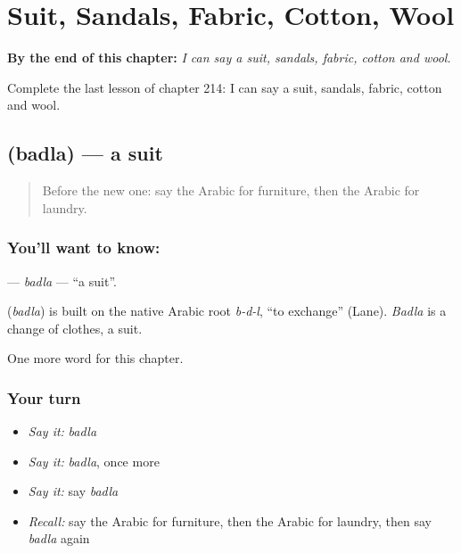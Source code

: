 
\chapter{Suit, Sandals, Fabric, Cotton, Wool}
\label{ch:ar-suit-sandals-fabric-cotton-wool}

\begin{chapteropening}
\textbf{By the end of this chapter:} \emph{I can say a suit, sandals, fabric, cotton and wool.}

Complete the last lesson of chapter 214: I can say a suit, sandals, fabric, cotton and wool.
\end{chapteropening}

\section[\texorpdfstring{\ar{بدلة} (badla)}{بدلة (badla)}]{ (badla) — a suit}

\label{lesson:AR-C214-badla}



\begin{quote}
Before the new one: say the Arabic for furniture, then the Arabic for laundry.
\end{quote}

\subsection*{You'll want to know: }
\textbf{} — \emph{badla} — \textquotedblleft{}a suit\textquotedblright{}.

\begin{cousinweb}
\textbf{} (\emph{badla}) is built on the native Arabic root \emph{b-d-l}, \textquotedblleft{}to exchange\textquotedblright{} (Lane). \emph{Badla} is a change of clothes, a suit.
\end{cousinweb}

\begin{grammarlens}[title={What you've built}]
One more word for this chapter.
\end{grammarlens}

\subsection*{Your turn}
\begin{itemize}
\raggedright
  \item \emph{Say it:} \emph{badla}
  \item \emph{Say it:} \emph{badla}, once more
  \item \emph{Say it:} say \emph{badla}
  \item \emph{Recall:} say the Arabic for furniture, then the Arabic for laundry, then say \emph{badla} again
\end{itemize}

